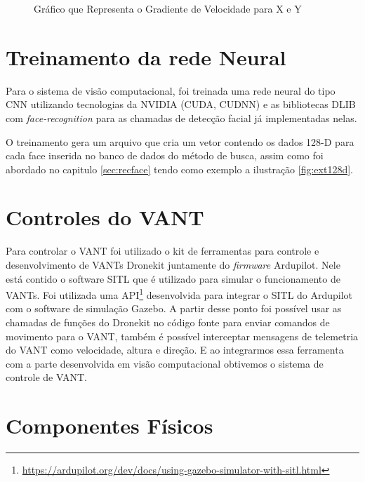 \begin{figure}[H]
	\centering
	\caption{Gráfico que Representa o Gradiente de Velocidade para X e Y}
	
	\label{fig:teste9}
\end{figure}

\section{Treinamento da rede Neural}

Para o sistema de visão computacional, foi treinada uma rede neural do tipo CNN utilizando tecnologias da NVIDIA (CUDA, CUDNN) e as bibliotecas DLIB com \textit{face-recognition} para as chamadas de detecção facial já implementadas nelas.

O treinamento gera um arquivo que cria um vetor contendo os dados 128-D para cada face inserida no banco de dados do método de busca, assim como foi abordado no capitulo \ref{sec:recface} tendo como exemplo a ilustração \ref{fig:ext128d}.

\section{Controles do VANT}

Para controlar o VANT foi utilizado o kit de ferramentas para controle e desenvolvimento de VANTs Dronekit juntamente do \textit{firmware} Ardupilot. Nele está contido o software SITL que é utilizado para simular o funcionamento de VANTs. Foi utilizada uma API\footnote{\url{https://ardupilot.org/dev/docs/using-gazebo-simulator-with-sitl.html}} desenvolvida para integrar o SITL do Ardupilot com o software de simulação Gazebo.
A partir desse ponto foi possível usar as chamadas de funções do Dronekit no código fonte para enviar comandos de movimento para o VANT, também é possível interceptar mensagens de telemetria do VANT como velocidade, altura e direção. E ao integrarmos essa ferramenta com a parte desenvolvida em visão computacional obtivemos o sistema de controle de VANT.


\section{Componentes Físicos}


